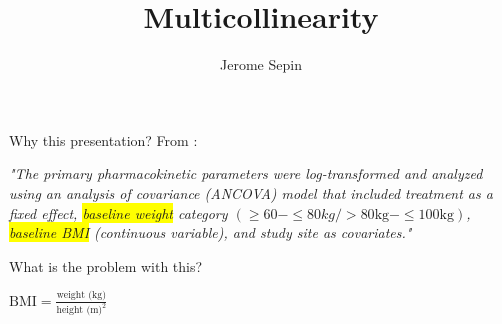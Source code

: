 \documentclass[english]{beamer}\usepackage[]{graphicx}\usepackage[]{xcolor}
\title[Multicollinearity]{Multicollinearity}
\author{Jerome Sepin}
\begin{document}
\maketitle

\begin{frame}{Why this presentation?}
From \cite{Schwabe2022}:

\textit{
"The primary pharmacokinetic parameters were log-transformed and analyzed using an analysis of covariance (ANCOVA) model that included treatment as a fixed effect, \colorbox{yellow}{baseline weight} category $\left(\geq 60-\leq 80kg/>80\text{kg}-\leq 100\text{kg}\right)$, \colorbox{yellow}{baseline BMI} (continuous variable), and study site as covariates." 
}

\end{frame}
\begin{frame}{What is the problem with this?}

$\text{BMI}=\frac{\text{weight (kg)}}{\text{height (m)}^2}$


\end{frame}
\end{document}
